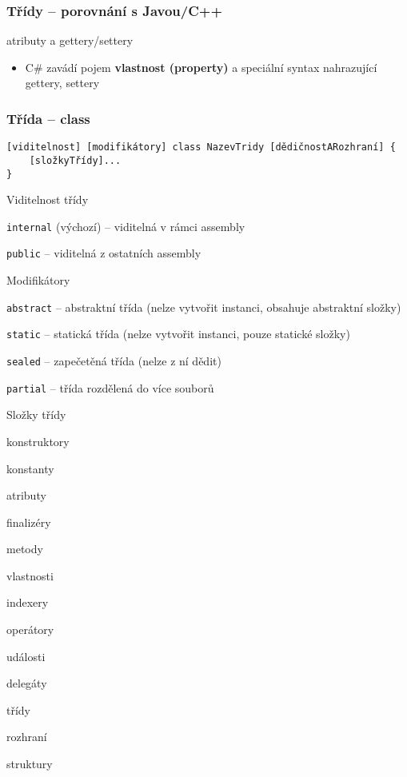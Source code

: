 \begin{frame}[fragile]
\frametitle{Třídy -- porovnání s Javou/C++}
\begin{bitemize}{}
\item atributy a gettery/settery
\begin{itemize}
\item C\# zavádí pojem \textbf{vlastnost (property)} a speciální syntax nahrazující gettery, settery
\end{itemize}
\end{bitemize}
\end{frame}






\begin{frame}[fragile]
\frametitle{Třída -- class}
\vfill
\begin{noteblock}{}
\begin{lstlisting}
[viditelnost] [modifikátory] class NazevTridy [dědičnostARozhraní] { 
	[složkyTřídy]...
}
\end{lstlisting}
\end{noteblock}
\vfill
\begin{bitemize}{Viditelnost třídy}
\item \lstinline|internal| (výchozí) -- viditelná v rámci assembly
\item \lstinline|public| -- viditelná z ostatních assembly
\end{bitemize}
\vfill
\begin{bitemize}{Modifikátory}
\item \lstinline|abstract| -- abstraktní třída (nelze vytvořit instanci, obsahuje abstraktní složky)
\item \lstinline|static| -- statická třída (nelze vytvořit instanci, pouze statické složky)
\item \lstinline|sealed| -- zapečetěná třída (nelze z ní dědit)
\item \lstinline[morekeywords=partial]|partial| -- třída rozdělená do více souborů
\end{bitemize}
\vfill
\end{frame}




\begin{frame}[fragile]
\begin{bitemize}{Složky třídy}
\item konstruktory
\item konstanty
\item atributy
\item finalizéry
\item metody
\item vlastnosti
\item indexery
\item operátory
\item události
\item delegáty
\item třídy
\item rozhraní
\item struktury
\end{bitemize}
\end{frame}





